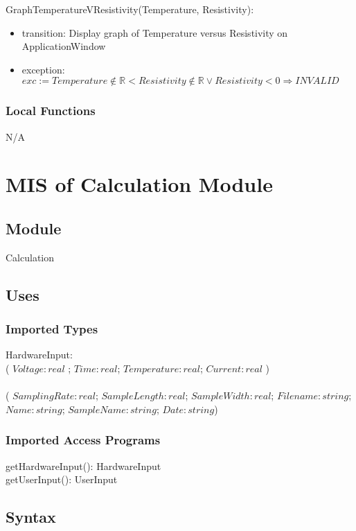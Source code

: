 \documentclass[12pt, titlepage]{article}
\begin{document}
\noindent GraphTemperatureVResistivity(Temperature, Resistivity):
\begin{itemize}
\item transition: Display graph of Temperature versus Resistivity on ApplicationWindow
\item exception: $exc:= Temperature \notin  \mathbb{R} <  Resistivity \notin  \mathbb{R} \lor Resistivity < 0\Rightarrow INVALID$
\end{itemize}

\subsubsection{Local Functions}

N/A

\newpage


\section{MIS of Calculation Module} \label{C} 

\subsection{Module}

Calculation

\subsection{Uses}

\subsubsection{Imported Types}
HardwareInput: \\
( $Voltage: real $ ; $Time: real$; $Temperature: real$; $Current: real$ )\\

 \\
( $SamplingRate: real$; $SampleLength: real$; $SampleWidth: real$; $Filename: string$; $Name: string$; $SampleName: string$; $Date: string$)

\subsubsection{Imported Access Programs}
getHardwareInput(): HardwareInput \\
getUserInput(): UserInput

\subsection{Syntax}
\end{document}
